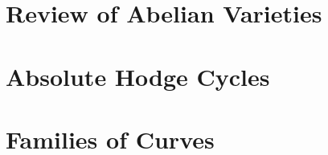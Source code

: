 \documentclass[openany]{book}
\begin{document}


\chapter{Review of Abelian Varieties} \label{chap:av}

\chapter{Absolute Hodge Cycles}





\chapter{Families of Curves}

\nirprintbib
\nirprintindex
\end{document}
